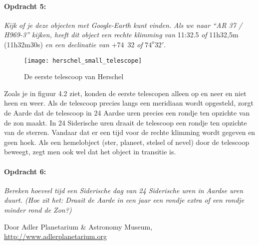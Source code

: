 \paragraph*{Opdracht 5:}

\emph{Kijk of je deze objecten met Google-Earth kunt vinden. Als we
naar ``AR 37 / H969-3'' kijken, heeft dit object een rechte klimming
van} 11:32.5 \emph{of} 11h32,5m (11h32m30s) \emph{en een declinatie
van} +74~32 \emph{of }$74^{o}32'$.

\begin{figure}[h]
\noindent \begin{centering}
\texttt{[image: herschel\_small\_telescope]}
\par\end{centering}

\caption{De eerste telescoop van Herschel\cite{herschel}}
\end{figure}

Zoals je in figuur 4.2 ziet, konden de eerste telescopen alleen op
en neer en niet heen en weer. Als de telescoop precies langs een meridiaan
wordt opgesteld, zorgt de Aarde dat de telescoop in 24 Aardse uren
precies een rondje ten opzichte van de zon maakt. In 24 Siderische
uren draait de telescoop een rondje ten opzichte van de sterren. Vandaar
dat er een tijd voor de rechte klimming wordt gegeven en geen hoek.
Als een hemelobject (ster, planeet, stelsel of nevel) door de telescoop
beweegt, zegt men ook wel dat het object in transitie is.


\paragraph*{Opdracht 6:}

\emph{Bereken hoeveel tijd een Siderische dag van 24 Siderische uren
in Aardse uren duurt. (Hoe zit het: Draait de Aarde in een jaar een
rondje extra of een rondje minder rond de Zon?)}

\begin{thebibliography}{9}
        Door Adler Planetarium \& Astronomy Museum, \url{http://www.adlerplanetarium.org}
\end{thebibliography}


